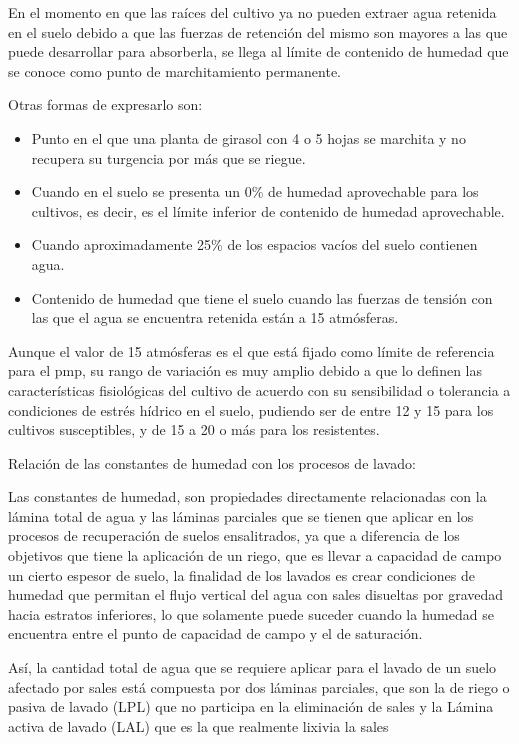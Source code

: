 En el momento en que las raíces del cultivo ya no pueden extraer agua retenida en el suelo debido a que las fuerzas de retención del mismo son mayores a las que puede desarrollar para absorberla, se llega al límite de contenido de humedad que se conoce como punto de marchitamiento permanente.

Otras formas de expresarlo son:
\begin{itemize}
\item Punto en el que una planta de girasol con 4 o 5 hojas se marchita y no recupera su turgencia por más que se riegue.
\item Cuando en el suelo se presenta un 0\% de humedad aprovechable para los cultivos, es decir, es el límite inferior de contenido de humedad aprovechable.
\item Cuando aproximadamente 25\% de los espacios vacíos del suelo contienen agua.
\item Contenido de humedad que tiene el suelo cuando las fuerzas de tensión con las que el agua se encuentra retenida están a 15 atmósferas.
\end{itemize}
Aunque el valor de 15 atmósferas es el que está fijado como límite de referencia para el pmp, su rango de variación es muy amplio debido a que lo definen las características fisiológicas del cultivo de acuerdo con su sensibilidad o tolerancia a condiciones de estrés hídrico en el suelo, pudiendo ser de entre 12 y 15 para los cultivos susceptibles, y de 15 a 20 o más para los resistentes.

Relación de las constantes de humedad con los procesos de lavado:

Las constantes de humedad, son propiedades directamente relacionadas con la lámina total de agua y las láminas parciales que se tienen que aplicar en los procesos de recuperación de suelos ensalitrados, ya que a diferencia de los objetivos que tiene la aplicación de un riego, que es llevar a capacidad de campo un cierto espesor de suelo, la finalidad de los lavados es crear condiciones de humedad que permitan el flujo vertical del agua con sales disueltas por gravedad hacia estratos inferiores, lo que solamente puede suceder cuando la humedad se encuentra entre el punto de capacidad de campo y el de saturación.

Así, la cantidad total de agua que se requiere aplicar para el lavado de un suelo afectado por sales está compuesta por dos láminas parciales, que son la de riego o pasiva de lavado (LPL) que no participa en la eliminación de sales y la Lámina activa de lavado (LAL) que es la que realmente lixivia la sales
